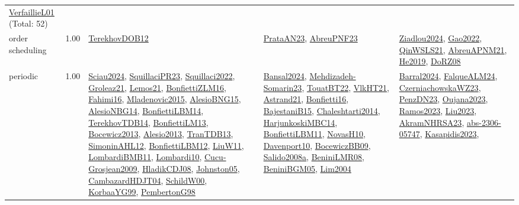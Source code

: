 {\begin{longtable}{p{3cm}r>{\raggedright\arraybackslash}p{6cm}>{\raggedright\arraybackslash}p{6cm}>{\raggedright\arraybackslash}p{8cm}}
\hyperref[detail:VerfaillieL01]{VerfaillieL01} (Total: 52)\\
\index{order scheduling}\index{Concepts!order scheduling}order scheduling &  1.00 & \hyperref[detail:TerekhovDOB12]{TerekhovDOB12} & \hyperref[detail:PrataAN23]{PrataAN23}, \hyperref[detail:AbreuPNF23]{AbreuPNF23} & \hyperref[detail:Ziadlou2024]{Ziadlou2024}, \hyperref[detail:Gao2022]{Gao2022}, \hyperref[detail:QinWSLS21]{QinWSLS21}, \hyperref[detail:AbreuAPNM21]{AbreuAPNM21}, \hyperref[detail:He2019]{He2019}, \hyperref[detail:DoRZ08]{DoRZ08}\\
\index{periodic}\index{Concepts!periodic}periodic &  1.00 & \hyperref[detail:Sciau2024]{Sciau2024}, \hyperref[detail:SquillaciPR23]{SquillaciPR23}, \hyperref[detail:Squillaci2022]{Squillaci2022}, \hyperref[detail:Groleaz21]{Groleaz21}, \hyperref[detail:Lemos21]{Lemos21}, \hyperref[detail:BonfiettiZLM16]{BonfiettiZLM16}, \hyperref[detail:Fahimi16]{Fahimi16}, \hyperref[detail:Mladenovic2015]{Mladenovic2015}, \hyperref[detail:AlesioBNG15]{AlesioBNG15}, \hyperref[detail:AlesioNBG14]{AlesioNBG14}, \hyperref[detail:BonfiettiLBM14]{BonfiettiLBM14}, \hyperref[detail:TerekhovTDB14]{TerekhovTDB14}, \hyperref[detail:BonfiettiLM13]{BonfiettiLM13}, \hyperref[detail:Bocewicz2013]{Bocewicz2013}, \hyperref[detail:Alesio2013]{Alesio2013}, \hyperref[detail:TranTDB13]{TranTDB13}, \hyperref[detail:SimoninAHL12]{SimoninAHL12}, \hyperref[detail:BonfiettiLBM12]{BonfiettiLBM12}, \hyperref[detail:LiuW11]{LiuW11}, \hyperref[detail:LombardiBMB11]{LombardiBMB11}, \hyperref[detail:Lombardi10]{Lombardi10}, \hyperref[detail:Cucu-Grosjean2009]{Cucu-Grosjean2009}, \hyperref[detail:HladikCDJ08]{HladikCDJ08}, \hyperref[detail:Johnston05]{Johnston05}, \hyperref[detail:CambazardHDJT04]{CambazardHDJT04}, \hyperref[detail:SchildW00]{SchildW00}, \hyperref[detail:KorbaaYG99]{KorbaaYG99}, \hyperref[detail:PembertonG98]{PembertonG98} & \hyperref[detail:Bansal2024]{Bansal2024}, \hyperref[detail:Mehdizadeh-Somarin23]{Mehdizadeh-Somarin23}, \hyperref[detail:TouatBT22]{TouatBT22}, \hyperref[detail:VlkHT21]{VlkHT21}, \hyperref[detail:Astrand21]{Astrand21}, \hyperref[detail:Bonfietti16]{Bonfietti16}, \hyperref[detail:BajestaniB15]{BajestaniB15}, \hyperref[detail:Chaleshtarti2014]{Chaleshtarti2014}, \hyperref[detail:HarjunkoskiMBC14]{HarjunkoskiMBC14}, \hyperref[detail:BonfiettiLBM11]{BonfiettiLBM11}, \hyperref[detail:NovasH10]{NovasH10}, \hyperref[detail:Davenport10]{Davenport10}, \hyperref[detail:BocewiczBB09]{BocewiczBB09}, \hyperref[detail:Salido2008a]{Salido2008a}, \hyperref[detail:BeniniLMR08]{BeniniLMR08}, \hyperref[detail:BeniniBGM05]{BeniniBGM05}, \hyperref[detail:Lim2004]{Lim2004} & \hyperref[detail:Barral2024]{Barral2024}, \hyperref[detail:FalqueALM24]{FalqueALM24}, \hyperref[detail:CzerniachowskaWZ23]{CzerniachowskaWZ23}, \hyperref[detail:PenzDN23]{PenzDN23}, \hyperref[detail:Oujana2023]{Oujana2023}, \hyperref[detail:Ramos2023]{Ramos2023}, \hyperref[detail:Liu2023]{Liu2023}, \hyperref[detail:AkramNHRSA23]{AkramNHRSA23}, \hyperref[detail:abs-2306-05747]{abs-2306-05747}, \hyperref[detail:Kasapidis2023]{Kasapidis2023}, 
\end{longtable}}
